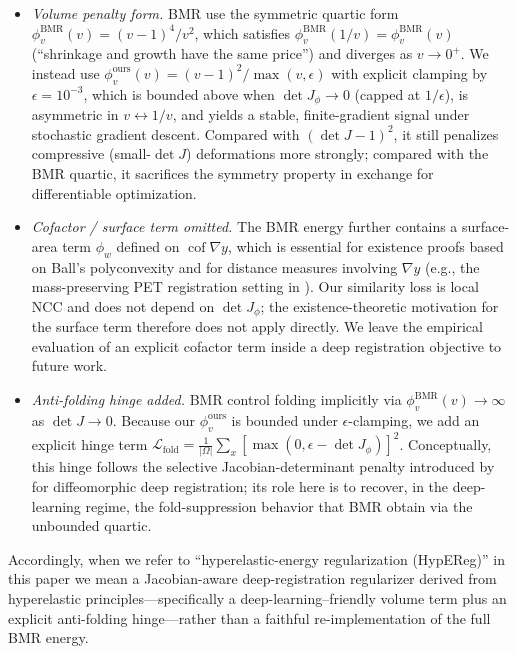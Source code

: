 \documentclass[11pt,a4paper]{article}
\begin{document}
\begin{itemize}\setlength\itemsep{2pt}
\item \emph{Volume penalty form.} BMR use the symmetric quartic form $\phi^{\mathrm{BMR}}_v(v)=(v-1)^4/v^2$, which satisfies $\phi^{\mathrm{BMR}}_v(1/v)=\phi^{\mathrm{BMR}}_v(v)$ (``shrinkage and growth have the same price'') and diverges as $v\to 0^+$. We instead use $\phi^{\mathrm{ours}}_v(v)=(v-1)^2/\max(v,\epsilon)$ with explicit clamping by $\epsilon=10^{-3}$, which is bounded above when $\det J_\phi\to 0$ (capped at $1/\epsilon$), is asymmetric in $v\leftrightarrow 1/v$, and yields a stable, finite-gradient signal under stochastic gradient descent. Compared with $(\det J-1)^2$, it still penalizes compressive (small-$\det J$) deformations more strongly; compared with the BMR quartic, it sacrifices the symmetry property in exchange for differentiable optimization.
\item \emph{Cofactor / surface term omitted.} The BMR energy further contains a surface-area term $\phi_w$ defined on $\operatorname{cof}\nabla y$, which is essential for existence proofs based on Ball's polyconvexity and for distance measures involving $\nabla y$ (e.g., the mass-preserving PET registration setting in \citet{burger2013hyperelastic}). Our similarity loss is local NCC and does not depend on $\det J_\phi$; the existence-theoretic motivation for the surface term therefore does not apply directly. We leave the empirical evaluation of an explicit cofactor term inside a deep registration objective to future work.
\item \emph{Anti-folding hinge added.} BMR control folding implicitly via $\phi^{\mathrm{BMR}}_v(v)\to\infty$ as $\det J\to 0$. Because our $\phi^{\mathrm{ours}}_v$ is bounded under $\epsilon$-clamping, we add an explicit hinge term $\mathcal{L}_{\mathrm{fold}}=\frac{1}{|\Omega|}\sum_x[\max(0,\epsilon-\det J_\phi)]^2$. Conceptually, this hinge follows the selective Jacobian-determinant penalty introduced by \citet{mok2020fast} for diffeomorphic deep registration; its role here is to recover, in the deep-learning regime, the fold-suppression behavior that BMR obtain via the unbounded quartic.
\end{itemize}
Accordingly, when we refer to ``hyperelastic-energy regularization (HypEReg)'' in this paper we mean a Jacobian-aware deep-registration regularizer derived from hyperelastic principles---specifically a deep-learning--friendly volume term plus an explicit anti-folding hinge---rather than a faithful re-implementation of the full BMR energy.
\end{document}
